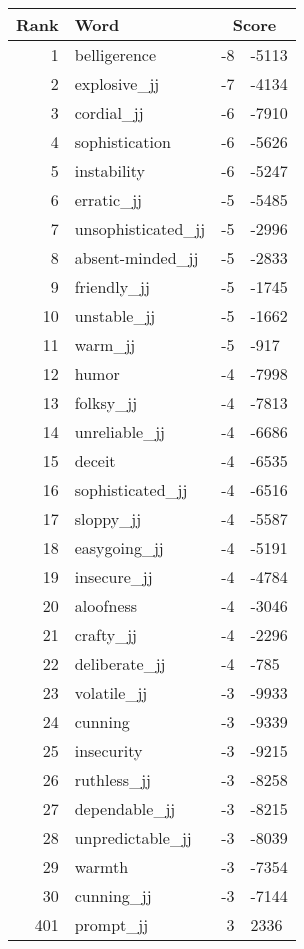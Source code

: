 \begin{longtable}[!htbp]{| rlr@{.}l |}
    \hline
    \textbf{Rank} & \textbf{Word} & \multicolumn{2}{c|}{\textbf{Score}} \\
    \hline
    \endhead
    1 & belligerence & -8 & -5113 \\
    2 & explosive\_jj & -7 & -4134 \\
    3 & cordial\_jj & -6 & -7910 \\
    4 & sophistication & -6 & -5626 \\
    5 & instability & -6 & -5247 \\
    6 & erratic\_jj & -5 & -5485 \\
    7 & unsophisticated\_jj & -5 & -2996 \\
    8 & absent-minded\_jj & -5 & -2833 \\
    9 & friendly\_jj & -5 & -1745 \\
    10 & unstable\_jj & -5 & -1662 \\
    11 & warm\_jj & -5 & -917 \\
    12 & humor & -4 & -7998 \\
    13 & folksy\_jj & -4 & -7813 \\
    14 & unreliable\_jj & -4 & -6686 \\
    15 & deceit & -4 & -6535 \\
    16 & sophisticated\_jj & -4 & -6516 \\
    17 & sloppy\_jj & -4 & -5587 \\
    18 & easygoing\_jj & -4 & -5191 \\
    19 & insecure\_jj & -4 & -4784 \\
    20 & aloofness & -4 & -3046 \\
    21 & crafty\_jj & -4 & -2296 \\
    22 & deliberate\_jj & -4 & -785 \\
    23 & volatile\_jj & -3 & -9933 \\
    24 & cunning & -3 & -9339 \\
    25 & insecurity & -3 & -9215 \\
    26 & ruthless\_jj & -3 & -8258 \\
    27 & dependable\_jj & -3 & -8215 \\
    28 & unpredictable\_jj & -3 & -8039 \\
    29 & warmth & -3 & -7354 \\
    30 & cunning\_jj & -3 & -7144 \\
    401 & prompt\_jj & 3 & 2336 \\

\end{longtable}
